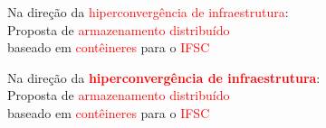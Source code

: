 \documentclass{beamer}
\begin{document}



        


\begin{frame}
    \centering
    \Large{Na direção da \textcolor{red}{hiperconvergência de infraestrutura}:
    \\Proposta de \textcolor{red}{armazenamento distribuído}
    \\baseado em \textcolor{red}{contêineres} para o \textcolor{red}{IFSC}}
    \break
\end{frame}


\begin{frame}
    \centering
    \Large{Na direção da \textbf{\textcolor{red}{hiperconvergência de infraestrutura}}:
    \\Proposta de \textcolor{red}{armazenamento distribuído}
    \\baseado em \textcolor{red}{contêineres} para o \textcolor{red}{IFSC}}
    \break
\end{frame}
\end{document}
